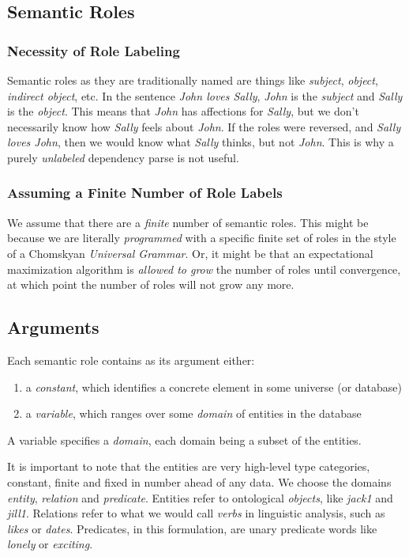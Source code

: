 \documentclass[12pt]{article}
\begin{document}
\subsection{Semantic Roles}
\subsubsection{Necessity of Role Labeling}
Semantic roles as they are traditionally named are things like {\em subject}, {\em object}, {\em indirect object}, etc.
In the sentence {\em John loves Sally}, {\em John} is the {\em subject} and {\em Sally} is the {\em object}.
This means that {\em John} has affections for {\em Sally}, but we don't necessarily know how {\em Sally} feels about {\em John}.
If the roles were reversed, and {\em Sally loves John}, then we would know what {\em Sally} thinks, but not {\em John}.
This is why a purely {\em unlabeled} dependency parse is not useful.

\subsubsection{Assuming a Finite Number of Role Labels}
We assume that there are a {\em finite} number of semantic roles.
This might be because we are literally {\em programmed} with a specific finite set of roles in the style of a Chomskyan {\em Universal Grammar}.
Or, it might be that an expectational maximization algorithm is {\em allowed to grow} the number of roles until convergence, at which point the number of roles will not grow any more.
\subsection{Arguments}
Each semantic role contains as its argument either:
\begin{enumerate}
    \item a \emph{constant}, which identifies a concrete element in some universe (or database)
    \item a \emph{variable}, which ranges over some \emph{domain} of entities in the database
\end{enumerate}

A variable specifies a \emph{domain}, each domain being a subset of the entities.

It is important to note that the entities are very high-level type categories, constant, finite and fixed in number ahead of any data.
We choose the domains \emph{entity}, \emph{relation} and \emph{predicate}.
Entities refer to ontological \emph{objects}, like \emph{jack1} and \emph{jill1}.
Relations refer to what we would call \emph{verbs} in linguistic analysis, such as \emph{likes} or \emph{dates}.
Predicates, in this formulation, are unary predicate words like \emph{lonely} or \emph{exciting}.
\end{document}

